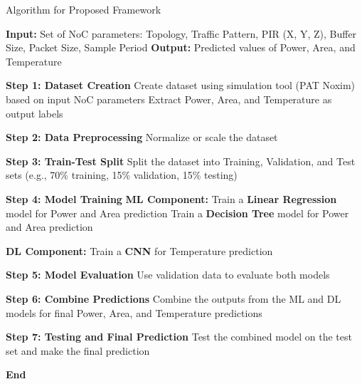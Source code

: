 \documentclass[conference]{IEEEtran}
\begin{document}
\begin{algorithm}[H] %
\caption{Algorithm for Proposed Framework}\label{alg:pat_prediction}
\begin{algorithmic}[1]
    \State \textbf{Input:} Set of NoC parameters: Topology, Traffic Pattern, PIR (X, Y, Z), Buffer Size, Packet Size, Sample Period
    \State \textbf{Output:} Predicted values of Power, Area, and Temperature
    
    \State \textbf{Step 1: Dataset Creation}
    \State Create dataset using simulation tool (PAT Noxim) based on input NoC parameters
    \State Extract Power, Area, and Temperature as output labels
    
    \State \textbf{Step 2: Data Preprocessing}
    \State Normalize or scale the dataset
    
    \State \textbf{Step 3: Train-Test Split}
    \State Split the dataset into Training, Validation, and Test sets (e.g., 70\% training, 15\% validation, 15\% testing)
    
    \State \textbf{Step 4: Model Training}
    \State \textbf{ML Component:}
    \State Train a \textbf{Linear Regression} model for Power and Area prediction
    \State Train a \textbf{Decision Tree} model for Power and Area prediction
    
    \State \textbf{DL Component:}
    \State Train a \textbf{CNN} for Temperature prediction
    
    \State \textbf{Step 5: Model Evaluation}
    \State Use validation data to evaluate both models
    
    \State \textbf{Step 6: Combine Predictions}
    \State Combine the outputs from the ML and DL models for final Power, Area, and Temperature predictions
    
    \State \textbf{Step 7: Testing and Final Prediction}
    \State Test the combined model on the test set and make the final prediction
    
    \State \textbf{End}
\end{algorithmic}
\end{algorithm}
\end{document}
